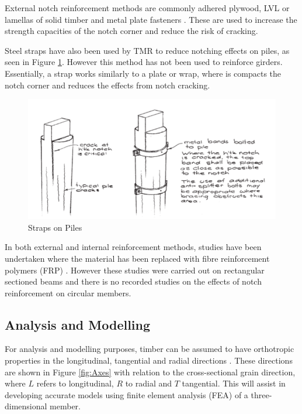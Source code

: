 \documentclass[11pt,a4paper]{article}
\numberwithin{equation}{subsection}
\begin{document}
\noindent
External notch reinforcement methods are commonly adhered plywood, LVL or lamellas of solid timber and metal plate fasteners \cite{jockwer_structural_2014,fawwaz_structural_2012}. These are used to increase the strength capacities of the notch corner and reduce the risk of cracking. 

\vspace*{\baselineskip}

\noindent
Steel straps have also been used by TMR to reduce notching effects on piles, as seen in Figure \ref{fig:External}. However this method has not been used to reinforce girders. Essentially, a strap works similarly to a plate or wrap, where is compacts the notch corner and reduces the effects from notch cracking. 

	\begin{figure}[h]
		\includegraphics[scale=0.6]{Piles}
		\caption{Straps on Piles \cite{_timber_2005}}
		\label{fig:External}
	\end{figure} 
	\pagebreak

\noindent
In both external and internal reinforcement methods, studies have been undertaken where the material has been replaced with fibre reinforcement polymers (FRP) \cite{jockwer_structural_2014}. However these studies were carried out on rectangular sectioned beams and there is no recorded studies on the effects of notch reinforcement on circular members. 

\subsection{Analysis and Modelling}
For analysis and modelling purposes, timber can be assumed to have orthotropic properties in the longitudinal, tangential and radial directions \cite{kim_modeling_2010}. These directions are shown in Figure \ref{fig:Axes} with relation to the cross-sectional grain direction, where $L$ refers to longitudinal, $R$ to radial and $T$ tangential. This will assist in developing accurate models using finite element analysis (FEA) of a three-dimensional member. 
\end{document}
